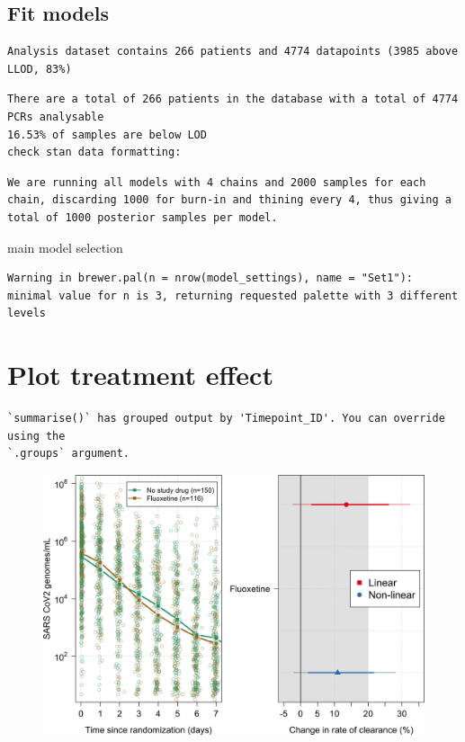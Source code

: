 \documentclass[
  letterpaper,
  DIV=11,
  numbers=noendperiod]{scrartcl}
\begin{document}
\hypertarget{fit-models}{%
\subsection{Fit models}\label{fit-models}}

\begin{verbatim}
Analysis dataset contains 266 patients and 4774 datapoints (3985 above LLOD, 83%)
\end{verbatim}

\begin{verbatim}
There are a total of 266 patients in the database with a total of 4774 PCRs analysable
16.53% of samples are below LOD
check stan data formatting:
\end{verbatim}

\begin{verbatim}
We are running all models with 4 chains and 2000 samples for each chain, discarding 1000 for burn-in and thining every 4, thus giving a total of 1000 posterior samples per model.
\end{verbatim}

main model selection

\begin{verbatim}
Warning in brewer.pal(n = nrow(model_settings), name = "Set1"): minimal value for n is 3, returning requested palette with 3 different levels
\end{verbatim}

\hypertarget{plot-treatment-effect}{%
\section{Plot treatment effect}\label{plot-treatment-effect}}

\begin{verbatim}
`summarise()` has grouped output by 'Timepoint_ID'. You can override using the
`.groups` argument.
\end{verbatim}

\begin{figure}[H]

{\centering \includegraphics{Fluoxetine_analysis_files/figure-pdf/Figure_main-1.png}

}

\end{figure}
\end{document}
